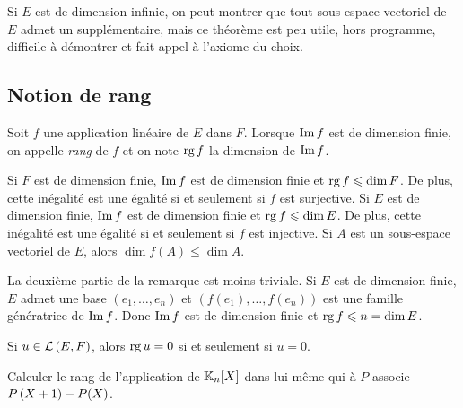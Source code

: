 \documentclass{magnolia}
\begin{document}
\begin{remarqueUnique}
\remarque Si $E$ est de dimension infinie, on peut montrer que tout sous-espace vectoriel
  de $E$ admet un supplémentaire, mais ce théorème est peu utile, hors programme, difficile à
  démontrer et fait appel à l'axiome du choix.
\end{remarqueUnique}

\subsection{Notion de rang}

\begin{definition}[utile=-3]
Soit $f$ une application linéaire de $E$ dans $F$. Lorsque $\operatorname{Im} f$ est de
dimension finie, on appelle \emph{rang} de $f$ et on note $\operatorname{rg} f$ la dimension de
$\operatorname{Im} f$.
\end{definition}

\begin{remarques}
\remarque[utile=-2] Si $F$ est de dimension finie, $\operatorname{Im} f$ est de dimension finie et
  $\operatorname{rg} f\leqslant \dim F$. De plus, cette inégalité est une égalité si et seulement
  si $f$ est surjective.
\remarque Si $E$ est de dimension finie, $\operatorname{Im} f$ est
  de dimension finie et $\operatorname{rg} f\leqslant \dim E$. De plus, cette inégalité est une
  égalité si et seulement si $f$ est injective.
\remarque Si $A$ est un sous-espace
  vectoriel de $E$, alors $\dim f(A)\leq \dim A$.
  \begin{sol}
  La deuxième partie de la remarque est moins triviale. Si $E$ est de dimension finie, $E$ admet une base $(e_1,\ldots,e_n)$ et $(f(e_1),\ldots,f(e_n))$ est une famille génératrice de $\operatorname{Im} f$. Donc $\operatorname{Im} f$ est de dimension finie et $\operatorname{rg} f\leqslant n=\dim E$.
  \end{sol}
\remarque[utile=-3] Si $u\in\mathcal{L}\left(E,F\right)$, alors $\operatorname{rg} u=0$ si et seulement si $u=0$.
\end{remarques}

\begin{exoUnique}
\exo Calculer le rang de l'application de $\polyK[n]$ dans lui-même
  qui à $P$ associe $P\left(X+1\right)-P(X)$.
\end{exoUnique}
\end{document}
